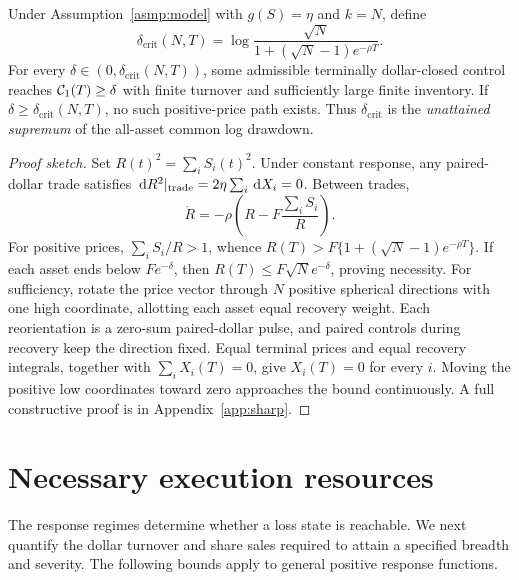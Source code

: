 \documentclass[review,hidelinks,onefignum,onetabnum]{siamonline250211}
\begin{document}
\begin{theorem}\label{thm:critical}
Under Assumption~\ref{asmp:model} with $g(S)=\eta$ and $k=N$, define
\begin{equation}\label{eq:critical}
\boxed{\delta_{\mathrm{crit}}(N,T)=
\log\frac{\sqrt N}{1+(\sqrt N-1)e^{-\rho T}}.}
\end{equation}
For every $\delta\in(0,\delta_{\mathrm{crit}}(N,T))$, some admissible terminally dollar-closed control reaches $\mathcal{C}_1(T)\ge\delta$ with finite turnover and sufficiently large finite inventory. If $\delta\ge\delta_{\mathrm{crit}}(N,T)$, no such positive-price path exists. Thus $\delta_{\mathrm{crit}}$ is the \emph{unattained supremum} of the all-asset common log drawdown.
\end{theorem}
\begin{proof}[Proof sketch]
Set $R(t)^2=\sum_iS_i(t)^2$. Under constant response, any paired-dollar trade satisfies $\,\mathrm{d} R^2|_{\rm trade}=2\eta\sum_i\,\mathrm{d} X_i=0$. Between trades,
\[
\dot R=-\rho\left(R-F\frac{\sum_iS_i}{R}\right).
\]
For positive prices, $\sum_iS_i/R>1$, whence $R(T)>F\{1+(\sqrt N-1)e^{-\rho T}\}$. If each asset ends below $Fe^{-\delta}$, then $R(T)\le F\sqrt Ne^{-\delta}$, proving necessity. For sufficiency, rotate the price vector through $N$ positive spherical directions with one high coordinate, allotting each asset equal recovery weight. Each reorientation is a zero-sum paired-dollar pulse, and paired controls during recovery keep the direction fixed. Equal terminal prices and equal recovery integrals, together with $\sum_iX_i(T)=0$, give $X_i(T)=0$ for every $i$. Moving the positive low coordinates toward zero approaches the bound continuously. A full constructive proof is in Appendix~\ref{app:sharp}.
\end{proof}


\section{Necessary execution resources}\label{sec:budget}
The response regimes determine whether a loss state is reachable. We next quantify the dollar turnover and share sales required to attain a specified breadth and severity. The following bounds apply to general positive response functions.
\end{document}
